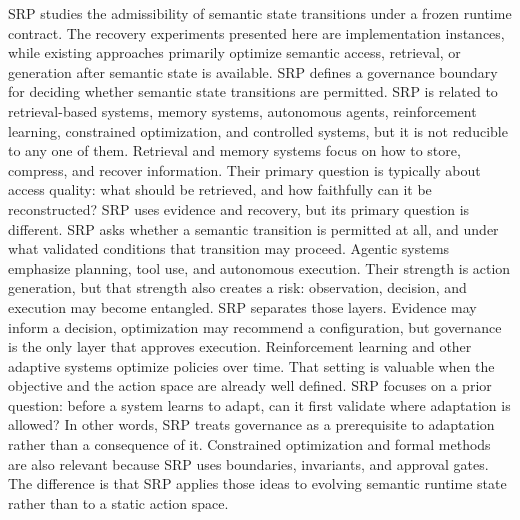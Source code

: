 {}SRP studies the admissibility of semantic state transitions under a frozen runtime contract. The recovery experiments presented here are implementation instances, while existing approaches primarily optimize semantic access, retrieval, or generation after semantic state is available.\markdownRendererSoftLineBreak
{}SRP defines a governance boundary for deciding whether semantic state transitions are permitted.\markdownRendererInterblockSeparator
{}
\markdownRendererSectionEnd \markdownRendererSectionBegin
{}\markdownRendererInterblockSeparator
{}SRP is related to retrieval-based systems, memory systems, autonomous agents, reinforcement learning, constrained optimization, and controlled systems, but it is not reducible to any one of them.\markdownRendererParagraphSeparator
{}Retrieval and memory systems focus on how to store, compress, and recover information. Their primary question is typically about access quality: what should be retrieved, and how faithfully can it be reconstructed? SRP uses evidence and recovery, but its primary question is different. SRP asks whether a semantic transition is permitted at all, and under what validated conditions that transition may proceed.\markdownRendererParagraphSeparator
{}Agentic systems emphasize planning, tool use, and autonomous execution. Their strength is action generation, but that strength also creates a risk: observation, decision, and execution may become entangled. SRP separates those layers. Evidence may inform a decision, optimization may recommend a configuration, but governance is the only layer that approves execution.\markdownRendererParagraphSeparator
{}Reinforcement learning and other adaptive systems optimize policies over time. That setting is valuable when the objective and the action space are already well defined. SRP focuses on a prior question: before a system learns to adapt, can it first validate where adaptation is allowed? In other words, SRP treats governance as a prerequisite to adaptation rather than a consequence of it.\markdownRendererParagraphSeparator
{}Constrained optimization and formal methods are also relevant because SRP uses boundaries, invariants, and approval gates. The difference is that SRP applies those ideas to evolving semantic runtime state rather than to a static action space.\markdownRendererInterblockSeparator
{}\markdownRendererSectionBegin
{}\markdownRendererInterblockSeparator
{}\markdownRendererInterblockSeparator
